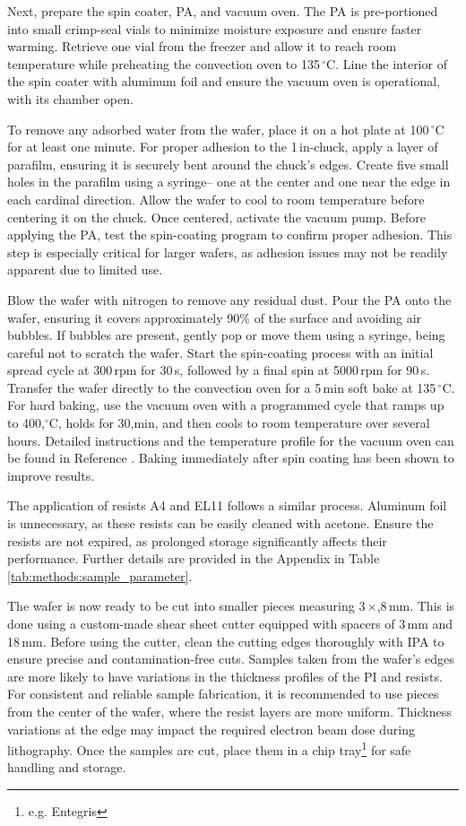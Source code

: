         Next, prepare the spin coater, PA, and vacuum oven. The PA is pre-portioned into small crimp-seal vials to minimize moisture exposure and ensure faster warming. Retrieve one vial from the freezer and allow it to reach room temperature while preheating the convection oven to 135\,$^\circ$C. Line the interior of the spin coater with aluminum foil and ensure the vacuum oven is operational, with its chamber open.

        To remove any adsorbed water from the wafer, place it on a hot plate at 100\,$^\circ$C for at least one minute. For proper adhesion to the 1\,in-chuck, apply a layer of parafilm, ensuring it is securely bent around the chuck's edges. Create five small holes in the parafilm using a syringe-- one at the center and one near the edge in each cardinal direction. Allow the wafer to cool to room temperature before centering it on the chuck. Once centered, activate the vacuum pump. Before applying the PA, test the spin-coating program to confirm proper adhesion. This step is especially critical for larger wafers, as adhesion issues may not be readily apparent due to limited use.
        
        Blow the wafer with nitrogen to remove any residual dust. Pour the PA onto the wafer, ensuring it covers approximately 90\% of the surface and avoiding air bubbles. If bubbles are present, gently pop or move them using a syringe, being careful not to scratch the wafer. Start the spin-coating process with an initial spread cycle at 300\,rpm for 30\,s, followed by a final spin at 5000\,rpm for 90\,s. Transfer the wafer directly to the convection oven for a 5\,min soft bake at 135\,$^\circ$C. For hard baking, use the vacuum oven with a programmed cycle that ramps up to 400,$^\circ$C, holds for 30,min, and then cools to room temperature over several hours. Detailed instructions and the temperature profile for the vacuum oven can be found in Reference \cite{raif_fabrication_nodate}. Baking immediately after spin coating has been shown to improve results.
        
        The application of resists A4 and EL11 follows a similar process. Aluminum foil is unnecessary, as these resists can be easily cleaned with acetone. Ensure the resists are not expired, as prolonged storage significantly affects their performance. Further details are provided in the Appendix in Table \ref{tab:methods:sample_parameter}.

        The wafer is now ready to be cut into smaller pieces measuring 3\,$\times$,8\,mm. This is done using a custom-made shear sheet cutter equipped with spacers of 3\,mm and 18\,mm. Before using the cutter, clean the cutting edges thoroughly with IPA to ensure precise and contamination-free cuts. Samples taken from the wafer's edges are more likely to have variations in the thickness profiles of the PI and resists. For consistent and reliable sample fabrication, it is recommended to use pieces from the center of the wafer, where the resist layers are more uniform. Thickness variations at the edge may impact the required electron beam dose during lithography. Once the samples are cut, place them in a chip tray\footnote{e.g. Entegris} for safe handling and storage.

